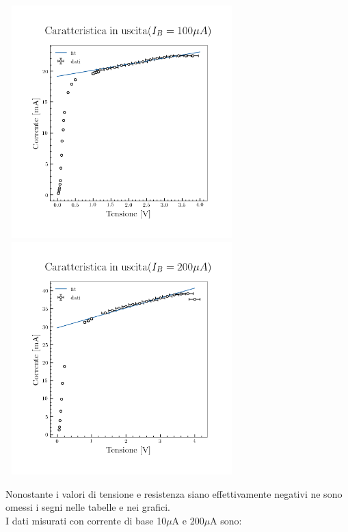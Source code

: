 \documentclass{amsart}
\begin{document}
    \begin{center}
        \includegraphics[width = 9cm, height = 9cm]{ib100/grafico_transistor.png}
        \hspace{0.1cm}
        \includegraphics[width = 9cm, height = 9cm]{ib200/grafico_transistor.png}
    \end{center}
    \newpage
    Nonostante i valori di tensione e resistenza siano effettivamente negativi ne sono omessi i segni nelle tabelle e nei grafici.\\
    I dati misurati con corrente di base 10$\mu$A e 200$\mu$A sono:\\
\end{document}
